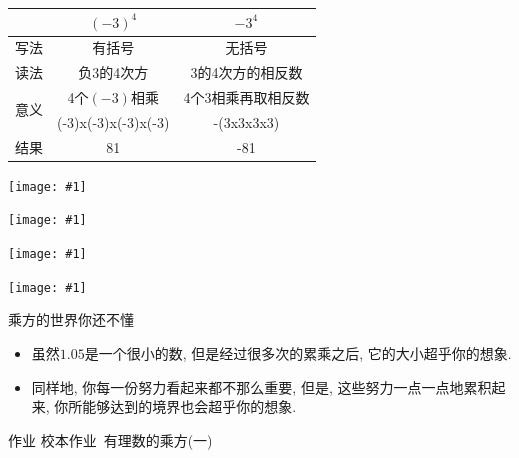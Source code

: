 \documentclass{beamer}
\begin{document}
\begin{frame}\begin{table}[htbp]\centering\begin{tabular}{l|c|c}
      \toprule      \ & $(-3)^4$ & $-3^4$ \\
      \hline\hline  写法 & 有括号 & 无括号 \\
      \hline        读法 & 负3的4次方 & 3的4次方的相反数 \\
      \hline        \multirow{2}{*}{意义} & 4个$(-3)$相乘 & 4个3相乘再取相反数 \\
                    &(-3)x(-3)x(-3)x(-3) & -(3x3x3x3)\\
      \hline       结果 & 81 & -81 \\
\bottomrule\end{tabular}\end{table}\end{frame}


\def\calcpng#1{
\begin{frame}
\hspace*{-2.1cm}\texttt{[image: \#1]}
\end{frame}
}
\calcpng{calc1.png}\calcpng{calc2.png}\calcpng{calc3.png}\calcpng{calc4.png}

\begin{frame}{乘方的世界你还不懂}
  \begin{exampleblock}{}
    \begin{itemize}
      \item 虽然$1.05$是一个很小的数, 但是经过很多次的累乘之后, 它的大小超乎你的想象.

      \item 同样地, 你每一份努力看起来都不那么重要, 但是, 这些努力一点一点地累积起来, 你所能够达到的境界也会超乎你的想象. 
    \end{itemize}
  \end{exampleblock}
\end{frame}

\begin{frame}
  \begin{block}{作业}
    校本作业\ 有理数的乘方(一)
  \end{block}
\end{frame}

\end{document}
